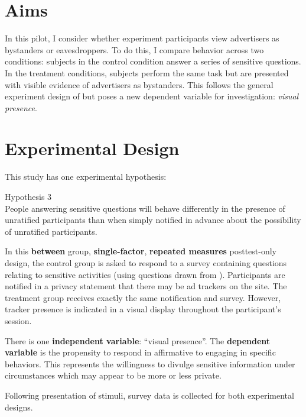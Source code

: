 \section{Aims}
\label{aims}

In this pilot, I consider whether experiment participants view advertisers as bystanders or eavesdroppers. To do this, I compare behavior across two conditions: subjects in the control condition answer a series of sensitive questions. In the treatment conditions, subjects perform the same task but are presented with visible evidence of advertisers as bystanders. This follows the general experiment design of  \citep{Acquisti:2012tp}  but poses a new dependent variable for investigation: \emph{visual presence}.

\section{Experimental Design}
\label{experimentaldesign}

This study has one experimental hypothesis:

\begin{description}
\item{Hypothesis 3} \hfill \\
People answering sensitive questions will behave differently in the presence of unratified participants than when simply notified in advance about the possibility of unratified participants.
\end{description}

In this \textbf{between} group, \textbf{single-factor}, \textbf{repeated measures} posttest-only design, the control group is asked to respond to a survey containing questions relating to sensitive activities (using questions drawn from  \citep{Acquisti:2012tp}).  Participants are notified in a privacy statement that there may be ad trackers on the site. The treatment group receives exactly the same notification and survey. However, tracker presence is indicated in a visual display throughout the participant's session. 

There is one \textbf{independent variable}: ``visual presence''. The \textbf{dependent variable} is the propensity to respond in affirmative to engaging in specific behaviors. This represents the willingness to divulge sensitive information under circumstances which may appear to be more or less private. 

Following presentation of stimuli, survey data is collected for both experimental designs. 

